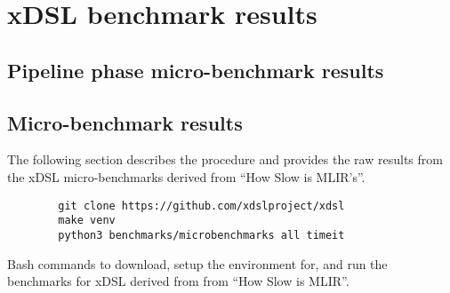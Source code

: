 \chapter{xDSL benchmark results}
\label{chap:xdsl-benchmark-results}

\section{Pipeline phase micro-benchmark results}

\section{Micro-benchmark results}

The following section describes the procedure and provides the raw results from the xDSL micro-benchmarks derived from ``How Slow is MLIR's''.

\vspace{2em}

\begin{code}
    \begin{verbatim}
        git clone https://github.com/xdslproject/xdsl
        make venv
        python3 benchmarks/microbenchmarks all timeit
    \end{verbatim}
    \caption{Bash commands to download, setup the environment for, and run the benchmarks for xDSL derived from from ``How Slow is MLIR''.}
    \label{listing:bash-xdsl-ubench-run}
\end{code}

\vspace{2em}


